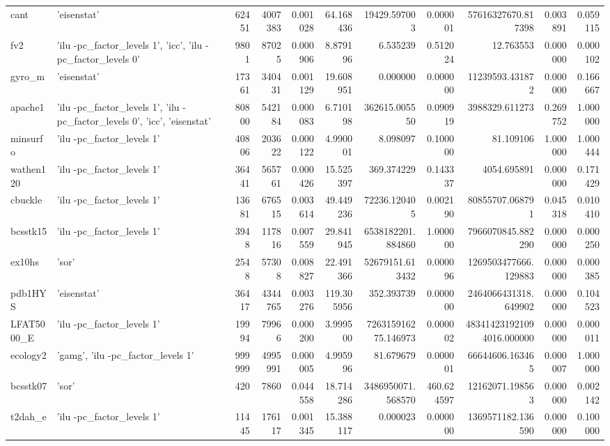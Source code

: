 \begin{tabular}{llrrrrrrrrr}
cant & {'eisenstat'} & 62451 & 4007383 & 0.001028 & 64.168436 & 19429.597003 & 0.000001 & 57616327670.817398 & 0.003891 & 0.059115 \\
fv2 & {'ilu -pc\_factor\_levels 1', 'icc', 'ilu -pc\_factor\_levels 0'} & 9801 & 87025 & 0.000906 & 8.879196 & 6.535239 & 0.512024 & 12.763553 & 0.000000 & 0.000102 \\
gyro\_m & {'eisenstat'} & 17361 & 340431 & 0.001129 & 19.608951 & 0.000000 & 0.000000 & 11239593.431872 & 0.000000 & 0.166667 \\
apache1 & {'ilu -pc\_factor\_levels 1', 'ilu -pc\_factor\_levels 0', 'icc', 'eisenstat'} & 80800 & 542184 & 0.000083 & 6.710198 & 362615.005550 & 0.090919 & 3988329.611273 & 0.269752 & 1.000000 \\
minsurfo & {'ilu -pc\_factor\_levels 1'} & 40806 & 203622 & 0.000122 & 4.990001 & 8.098097 & 0.100000 & 81.109106 & 1.000000 & 1.000444 \\
wathen120 & {'ilu -pc\_factor\_levels 1'} & 36441 & 565761 & 0.000426 & 15.525397 & 369.374229 & 0.143337 & 4054.695891 & 0.000000 & 0.171429 \\
cbuckle & {'ilu -pc\_factor\_levels 1'} & 13681 & 676515 & 0.003614 & 49.449236 & 72236.120405 & 0.002190 & 80855707.068791 & 0.045318 & 0.010410 \\
bcsstk15 & {'ilu -pc\_factor\_levels 1'} & 3948 & 117816 & 0.007559 & 29.841945 & 6538182201.884860 & 1.000000 & 7966070845.882290 & 0.000000 & 0.000250 \\
ex10hs & {'sor'} & 2548 & 57308 & 0.008827 & 22.491366 & 52679151.613432 & 0.000096 & 1269503477666.129883 & 0.000000 & 0.000385 \\
pdb1HYS & {'eisenstat'} & 36417 & 4344765 & 0.003276 & 119.305956 & 352.393739 & 0.000000 & 2464066431318.649902 & 0.000000 & 0.104523 \\
LFAT5000\_E & {'ilu -pc\_factor\_levels 1'} & 19994 & 79966 & 0.000200 & 3.999500 & 726315916275.146973 & 0.000002 & 483414231921094016.000000 & 0.000000 & 0.000011 \\
ecology2 & {'gamg', 'ilu -pc\_factor\_levels 1'} & 999999 & 4995991 & 0.000005 & 4.995996 & 81.679679 & 0.000001 & 66644606.163465 & 0.000007 & 1.000000 \\
bcsstk07 & {'sor'} & 420 & 7860 & 0.044558 & 18.714286 & 3486950071.568570 & 460.624597 & 12162071.198563 & 0.000000 & 0.002142 \\
t2dah\_e & {'ilu -pc\_factor\_levels 1'} & 11445 & 176117 & 0.001345 & 15.388117 & 0.000023 & 0.000000 & 1369571182.136590 & 0.000000 & 0.100000 \\

\end{tabular}
